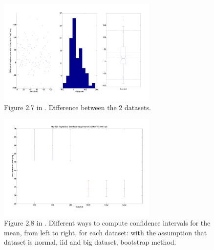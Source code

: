 \documentclass[10pt]{article}
\begin{document}
\begin{figure}[h!]
  \centering
  \includegraphics[width=0.7\textwidth]{images/hw1_1_27}
  \caption{Figure 2.7 in \cite{leb}. Difference between the 2 datasets.}
  \label{fig:27}
\end{figure}

\begin{figure}[h!]
  \centering
  \includegraphics[width=0.7\textwidth]{images/hw1_1_28}
  \caption{Figure 2.8 in \cite{leb}. Different ways to compute confidence intervals for the mean, from left to right, for each dataset: with the assumption that dataset is normal, iid and big dataset, bootstrap method.}
  \label{fig:28}
\end{figure}
\end{document}
